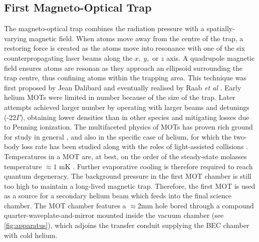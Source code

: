
\subsection*{First Magneto-Optical Trap}
	The magneto-optical trap combines the radiation pressure with a spatially-varying magnetic field.
	When atoms move away from the centre of the trap, a restoring force is created as the atoms move into resonance with one of the six counterpropagating laser beams along the $x,~y,$ or $z$ axis.
	A quadrupole magnetic field ensures atoms are resonan as they approach an ellipsoid surrounding the trap centre, thus confining atoms within the trapping area.
	This technique was first proposed by Jean Dalibard and eventually realised by Raab \emph{et al} \cite{Raab87}.
	Early helium MOTs were limited in number because of the size of the trap.
	Later attempts achieved larger number by operating with larger beams and detunings (-22$\Gamma$), obtaining lower densities than in other species \cite{Tol99} and mitigating losses due to Penning ionization.
	The multifaceted physics of MOTs has proven rich ground for study in general \cite{Townsend95,Walker90}, and also in the specific case of helium, for which the two-body loss rate has been studied \cite{Tol99} along with the roles of light-assisted collisions \cite{Papers}.
	Temperatures in a MOT are, at best, on the order of the steady-state molasses temperature $\approx1$ mK \cite{Lett81}.
	Further evaporative cooling is therefore required to reach quantum degeneracy.
	The background pressure in the first MOT chamber is still too high to maintain a long-lived magnetic trap.
	Therefore, the first MOT is used as a source for a secondary helium beam which feeds into the final science chamber.
	The MOT chamber features a $\approx$2mm hole bored through a compound quarter-waveplate-and-mirror mounted inside the vacuum chamber (see \ref{fig:apparatus}), which adjoins the transfer conduit supplying the BEC chamber with cold helium.

